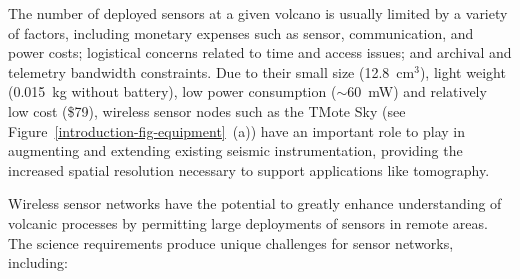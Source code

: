 The number of deployed sensors at a given volcano is usually limited by a
variety of factors, including monetary expenses such as sensor,
communication, and power costs; logistical concerns related to time and
access issues; and archival and telemetry bandwidth constraints. Due to their
small size (12.8~$\mathrm{cm}^3$), light weight (0.015~kg without battery),
low power consumption ($\sim$60~mW) and relatively low cost (\$79), wireless
sensor nodes such as the TMote Sky (see
Figure~\ref{introduction-fig-equipment}~(a)) have an important role to play
in augmenting and extending existing seismic instrumentation, providing the
increased spatial resolution necessary to support applications like
tomography.

Wireless sensor networks have the potential to greatly enhance understanding
of volcanic processes by permitting large deployments of sensors in remote
areas. The science requirements produce unique challenges for sensor
networks, including:

\vfill\eject

